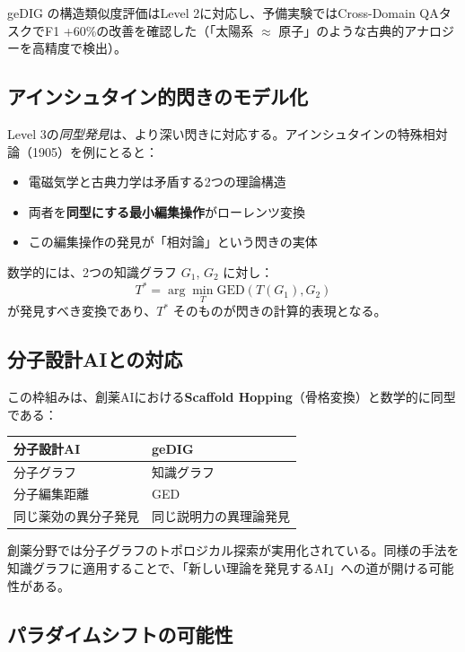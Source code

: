 \documentclass[ja=standard,xelatex]{bxjsarticle}
\begin{document}
geDIG の構造類似度評価はLevel 2に対応し、予備実験ではCross-Domain QAタスクでF1 +60\%の改善を確認した（「太陽系 $\approx$ 原子」のような古典的アナロジーを高精度で検出）。

\subsection{アインシュタイン的閃きのモデル化}

Level 3の\emph{同型発見}は、より深い閃きに対応する。アインシュタインの特殊相対論（1905）を例にとると：
\begin{itemize}[leftmargin=1.8em]
  \item 電磁気学と古典力学は矛盾する2つの理論構造
  \item 両者を\textbf{同型にする最小編集操作}がローレンツ変換
  \item この編集操作の発見が「相対論」という閃きの実体
\end{itemize}

数学的には、2つの知識グラフ $G_1$, $G_2$ に対し：
\begin{equation}
  T^* = \arg\min_T \mathrm{GED}(T(G_1), G_2)
  \label{eq:insight_transform}
\end{equation}
が発見すべき変換であり、$T^*$ そのものが閃きの計算的表現となる。

\subsection{分子設計AIとの対応}

この枠組みは、創薬AIにおける\textbf{Scaffold Hopping}（骨格変換）と数学的に同型である：
\begin{center}
\begin{tabular}{ll}
\toprule
分子設計AI & geDIG \\
\midrule
分子グラフ & 知識グラフ \\
分子編集距離 & GED \\
同じ薬効の異分子発見 & 同じ説明力の異理論発見 \\
\bottomrule
\end{tabular}
\end{center}

創薬分野では分子グラフのトポロジカル探索が実用化されている。同様の手法を知識グラフに適用することで、「新しい理論を発見するAI」への道が開ける可能性がある。

\subsection{パラダイムシフトの可能性}
\end{document}
